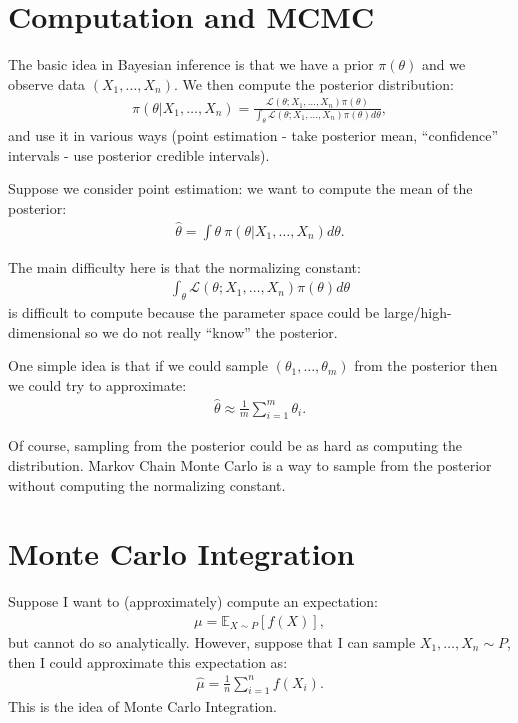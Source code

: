 \documentclass[twoside,12pt]{article}
\begin{document}
\section{Computation and MCMC}

 The basic idea in Bayesian inference is that we have a prior $\pi(\theta)$ and we observe data $(X_1,\ldots,X_n)$. We then compute the posterior distribution:
\begin{align*}
\pi(\theta | X_1,\ldots, X_n) = \frac{\mathcal{L}(\theta ; X_1,\ldots,X_n) \pi(\theta)}{ \int_{\theta} \mathcal{L}(\theta ; X_1,\ldots,X_n) \pi(\theta) d\theta},
\end{align*}
and use it in various ways (point estimation - take posterior mean, ``confidence'' intervals - use posterior  credible intervals).

Suppose we consider point estimation: we want to compute the mean of the posterior:
\begin{align*}
\widehat{\theta} = \int \theta~\pi(\theta | X_1,\ldots, X_n) d\theta.
\end{align*}

The main difficulty here is that the normalizing constant:
\begin{align*}
\int_{\theta} \mathcal{L}(\theta ; X_1,\ldots,X_n) \pi(\theta) d\theta
\end{align*} 
is difficult to compute because the parameter space could be large/high-dimensional so we do not really ``know'' the posterior. 

One simple idea is that if we could sample $(\theta_1,\ldots,\theta_m)$ from the posterior then we could try to approximate:
\begin{align*}
\widehat{\theta} \approx \frac{1}{m} \sum_{i=1}^m \theta_i.
\end{align*}

Of course, sampling from the posterior could be as hard as computing the distribution. Markov Chain Monte Carlo is a way to sample from the posterior without computing the normalizing constant.




\section{Monte Carlo Integration}
Suppose I want to 
(approximately) compute an expectation:
\begin{align*}
\mu = \mathbb{E}_{X \sim P} [ f(X) ],
\end{align*}
but cannot do so analytically. However, suppose that I can sample $X_1,\ldots,X_n \sim P$, then
I could approximate this expectation as:
\begin{align*}
\widehat{\mu} = \frac{1}{n} \sum_{i=1}^n f(X_i).
\end{align*}
This is the idea of Monte Carlo Integration. 
\end{document}
